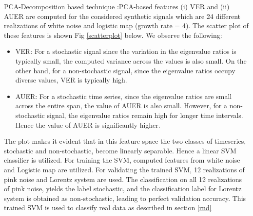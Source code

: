 \documentclass[journal]{IEEEtran}
\begin{document}
	
		PCA-Decomposition based technique :PCA-based features (i) VER and (ii) AUER  are computed for the considered synthetic signals which are 24 different realizations of white noise and logistic map (growth rate = 4). The scatter plot of these features is shown Fig \ref{scatterplot} below. We observe the following:
	\begin{itemize}
		\item VER: For a stochastic signal since the variation in the eigenvalue ratios is typically small, the computed variance across the values is also small. On the other hand, for a non-stochastic signal, since the eigenvalue ratios occupy diverse values, VER is typically high.
		\item AUER: For a stochastic time series, since the eigenvalue ratios  are small across the entire span, the value of AUER is also small. However, for a non-stochastic signal, the eigenvalue ratios remain high for longer time intervals. Hence the value of AUER is significantly higher.
	\end{itemize}


	The plot makes it evident that in this feature space the two classes of timeseries, stochastic and non-stochastic, become linearly separable. Hence a linear SVM classifier is utilized. For training the SVM, computed features from white noise and Logistic map are utilized. For validating the trained SVM, 12 realizations of pink noise and Lorentz system are used. The classification on all 12 realizations of pink noise, yields the label stochastic, and the classification label for Lorentz system is obtained as non-stochastic, leading to perfect validation accuracy. This trained SVM is used to classify real data as described in section \ref{rnd}
	
\end{document}
